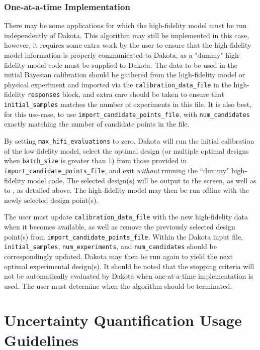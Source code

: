 \subsubsection{One-at-a-time Implementation}

There may be some applications for which the high-fidelity model must be run
independently of Dakota. This algorithm may still be implemented in this case,
however, it requires some extra work by the user to ensure that the 
high-fidelity model information is properly communicated to Dakota, as a 
"dummy" high-fidelity model code must be supplied to Dakota. The data to be 
used in the initial Bayesian calibration should be gathered from the 
high-fidelity model or physical experiment and imported via the 
\texttt{calibration\_data\_file} in the high-fidelity \texttt{responses} block, 
and extra care should be taken to ensure that \texttt{initial\_samples} matches 
the number of experiments in this file. It is also best, for this use-case, to 
use \texttt{import\_candidate\_points\_file}, with \texttt{num\_candidates} 
exactly matching the number of candidate points in the file.

By setting \texttt{max\_hifi\_evaluations} to zero, Dakota will run the initial
calibration of the low-fidelity model, select the optimal design (or multiple
optimal designs when \texttt{batch\_size} is greater than 1) from 
those provided in \texttt{import\_candidate\_points\_file}, and exit 
\textit{without} running the ``dummy" high-fidelity model code. The selected
design(s) will be output to the screen, as well as to 
, as detailed above. The high-fidelity
model may then be run offline with the newly selected design point(s).

The user must update \texttt{calibration\_data\_file} with the new 
high-fidelity data when it becomes available, as well as remove the previously
selected design point(s) from \texttt{import\_candidate\_points\_file}. Within 
the Dakota input file, \texttt{initial\_samples}, \texttt{num\_experiments}, 
and \texttt{num\_candidates} should be correspondingly updated. Dakota may then
be run again to yield the next optimal experimental design(s). It should be 
noted that the stopping criteria will not be automatically evaluated by Dakota 
when one-at-a-time implementation is used. The user must determine when the 
algorithm should be terminated.

\section{Uncertainty Quantification Usage Guidelines} \label{usage:uq}

